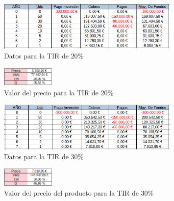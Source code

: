 \documentclass[11pt,letterpaper,onecolumn]{article}
\begin{document}
\begin{itemize}
	 \begin{figure}[H]
	 	\centering
		\includegraphics[width=0.8\textwidth]{imagen/ej2a_2.PNG}
	 	\caption{Datos para la TIR de 20\%}
	 	\label{fig:imagen-ej2a_2-PNG}
	 \end{figure}	
	 \begin{figure}[H]
	 	\centering
		\includegraphics[width=0.23\textwidth]{imagen/ej2a_2_van.PNG}
	 	\caption{Valor del precio para la TIR de 20\%}
	 	\label{fig:imagen-ej2a_2_van-PNG}
	 \end{figure}
	 \begin{figure}[H]
	 	\centering
		\includegraphics[width=0.8\textwidth]{imagen/ej2a_3.PNG}
	 	\caption{Datos para la TIR de 30\%}
	 	\label{fig:imagen-ej2a_3-PNG}
	 \end{figure}
	 \begin{figure}[H]
	 	\centering
		\includegraphics[width=0.23\textwidth]{imagen/ej2a_3_van.PNG}
	 	\caption{Valor del precio del producto para la TIR de 30\%}
	 	\label{fig:imagen-ej2a_3_van-PNG}
	 \end{figure}
\end{itemize}
\end{document}
